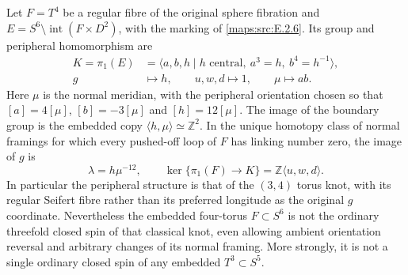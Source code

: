 \begin{proposition}\label{maps:src:E.2.10}


Let $F=T^4$ be a regular fibre of the original sphere fibration and
$E=S^6\setminus\operatorname{int}(F\times D^2)$, with the marking of
\ref{maps:src:E.2.6}. Its group and peripheral homomorphism are
\[
 \begin{split}
 K=\pi_1(E)&=\langle a,b,h\mid h\text{ central},\ a^3=h,
                                      \ b^4=h^{-1}\rangle,\\
 g&\longmapsto h,\qquad u,w,d\longmapsto1,
       \qquad \mu\longmapsto ab.
 \end{split}
 \tag{E.S1}\label{maps:eq:E.S1}
\]
Here $\mu$ is the normal meridian, with the peripheral orientation
chosen so that $[a]=4[\mu]$, $[b]=-3[\mu]$ and $[h]=12[\mu]$.
The image of the boundary group is the embedded copy
$\langle h,\mu\rangle\simeq\mathbb Z^2$. In the unique homotopy
class of normal framings for which every pushed-off loop of $F$
has linking number zero, the image of $g$ is
\[
             \lambda=h\mu^{-12},
 \qquad \ker\{\pi_1(F)\longrightarrow K\}
                 =\mathbb Z\langle u,w,d\rangle.
 \tag{E.S2}\label{maps:eq:E.S2}
\]
In particular the peripheral structure is that of the $(3,4)$
torus knot, with its regular Seifert fibre rather than its preferred
longitude as the original $g$ coordinate. Nevertheless the embedded
four-torus $F\subset S^6$ is not the ordinary threefold closed spin
of that classical knot, even allowing ambient orientation reversal
and arbitrary changes of its normal framing. More strongly, it is
not a single ordinary closed spin of any embedded $T^3\subset S^5$.

\end{proposition}


